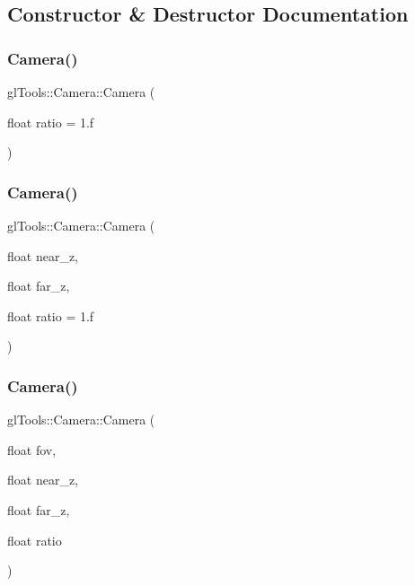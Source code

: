 \subsection{Constructor \& Destructor Documentation}
\mbox{\label{classgl_tools_1_1_camera_ac2b07eeb97680b76381567ff36375bd3}} 
\subsubsection{Camera()\hspace{0.1cm}{\footnotesize\ttfamily [1/3]}}
{\footnotesize\ttfamily gl\+Tools\+::\+Camera\+::\+Camera (\begin{DoxyParamCaption}\item[{float}]{ratio = {\ttfamily 1.f} }\end{DoxyParamCaption})\hspace{0.3cm}{\ttfamily [inline]}}

\mbox{\label{classgl_tools_1_1_camera_ad5894652563f171e05148b0354a7526b}} 
\subsubsection{Camera()\hspace{0.1cm}{\footnotesize\ttfamily [2/3]}}
{\footnotesize\ttfamily gl\+Tools\+::\+Camera\+::\+Camera (\begin{DoxyParamCaption}\item[{float}]{near\+\_\+z,  }\item[{float}]{far\+\_\+z,  }\item[{float}]{ratio = {\ttfamily 1.f} }\end{DoxyParamCaption})\hspace{0.3cm}{\ttfamily [inline]}}

\mbox{\label{classgl_tools_1_1_camera_abd24b0ebcbf5e53c50ad65d7afda2b50}} 
\subsubsection{Camera()\hspace{0.1cm}{\footnotesize\ttfamily [3/3]}}
{\footnotesize\ttfamily gl\+Tools\+::\+Camera\+::\+Camera (\begin{DoxyParamCaption}\item[{float}]{fov,  }\item[{float}]{near\+\_\+z,  }\item[{float}]{far\+\_\+z,  }\item[{float}]{ratio }\end{DoxyParamCaption})\hspace{0.3cm}{\ttfamily [inline]}}



